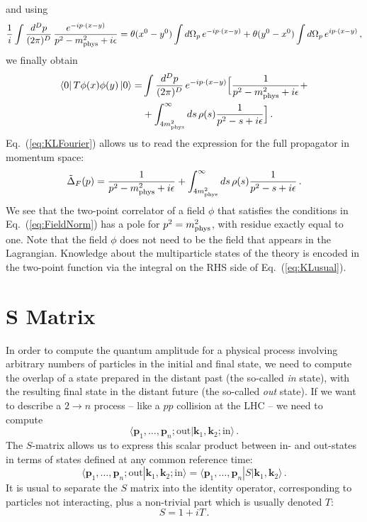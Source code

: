 \documentclass[notes]{subfiles}
\begin{document}
and using 
\begin{align}
  \frac{1}{i} \int \frac{d^Dp}{(2\pi)^D}\,
  \frac{e^{-ip\cdot(x-y)}}{p^2-m_\mathrm{phys}^2+i\epsilon} = 
  \theta(x^0-y^0) \int d\Omega_p\, e^{-ip\cdot(x-y)} +
  \theta(y^0-x^0) \int d\Omega_p\, e^{ip\cdot(x-y)}\, , 
\end{align}
we finally obtain
\begin{align}
  \bra{0} T \phi(x) \phi(y) \ket{0}
  =& \int \frac{d^Dp}{(2\pi)^D}\,
     e^{-ip\cdot(x-y)} \Big[
     \frac{1}{p^2-m_\mathrm{phys}^2+i\epsilon} + \nonumber \\
  \label{eq:KLFourier}
  & + \int_{4m_\mathrm{phys}^2}^\infty ds\, \rho(s) \frac{1}{p^2-s+i\epsilon} 
     \Big]\, .
\end{align}
Eq.~(\ref{eq:KLFourier}) allows us to read the expression for the full
propagator in momentum space:
\begin{align}
  \label{eq:KLusual}
  \tilde{\Delta}_F(p) = \frac{1}{p^2-m_\mathrm{phys}^2+i\epsilon} 
  + \int_{4m_\mathrm{phys}^2}^\infty ds\, \rho(s) \frac{1}{p^2-s+i\epsilon}\, . 
\end{align}
We see that the two-point correlator of a field $\phi$ that satisfies
the conditions in Eq.~(\ref{eq:FieldNorm}) has a pole for
$p^2=m_\mathrm{phys}^2$, with residue exactly equal to one. Note that the field
$\phi$ does not need to be the field that appears in the
Lagrangian. Knowledge about the multiparticle states of the theory is
encoded in the two-point function via the integral on the RHS side of
Eq.~(\ref{eq:KLusual}). 

\section{S Matrix}
\label{sec:s-matrix}

In order to compute the quantum amplitude for a physical process
involving arbitrary numbers of particles in the initial and final
state, we need to compute the overlap of a state prepared in the
distant past (the so-called \emph{in} state), with the resulting final
state in the distant future (the so-called \emph{out} state). If
we want to describe a $2\to n$ process -- like a $pp$ collision at
the LHC -- we need to compute
\begin{equation}
  \label{eq:ScattAmpl}
  \langle \mathbf{p}_1, \ldots, \mathbf{p}_n; \mathrm{out} |
  \mathbf{k}_1, \mathbf{k}_2; \mathrm{in}\rangle\, .
\end{equation}
The $S$-matrix allows us to express this scalar product between in-
and out-states in terms of states defined at any common reference
time: 
\begin{equation}
  \label{eq:SMatDef}
   \langle \mathbf{p}_1, \ldots, \mathbf{p}_n; \mathrm{out} |
  \mathbf{k}_1, \mathbf{k}_2; \mathrm{in}\rangle = 
   \langle \mathbf{p}_1, \ldots, \mathbf{p}_n | S |
  \mathbf{k}_1, \mathbf{k}_2\rangle\, .
\end{equation}
It is usual to separate the $S$ matrix into the identity operator,
corresponding to particles not interacting, plus a non-trivial part
which is usually denoted $T$:
\begin{equation}
  \label{eq:TMatDef}
  S = 1 + i T\, .
\end{equation}
\end{document}
